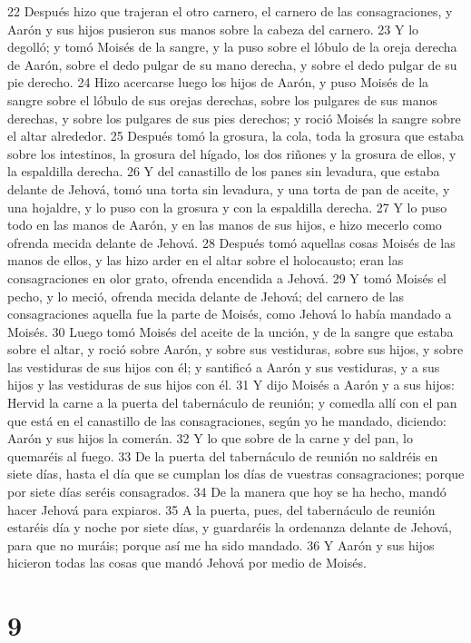 22 Después hizo que trajeran el otro carnero, el carnero de las consagraciones, y Aarón y sus hijos pusieron sus manos sobre la cabeza del carnero.
23 Y lo degolló; y tomó Moisés de la sangre, y la puso sobre el lóbulo de la oreja derecha de Aarón, sobre el dedo pulgar de su mano derecha, y sobre el dedo pulgar de su pie derecho.
24 Hizo acercarse luego los hijos de Aarón, y puso Moisés de la sangre sobre el lóbulo de sus orejas derechas, sobre los pulgares de sus manos derechas, y sobre los pulgares de sus pies derechos; y roció Moisés la sangre sobre el altar alrededor.
25 Después tomó la grosura, la cola, toda la grosura que estaba sobre los intestinos, la grosura del hígado, los dos riñones y la grosura de ellos, y la espaldilla derecha.
26 Y del canastillo de los panes sin levadura, que estaba delante de Jehová, tomó una torta sin levadura, y una torta de pan de aceite, y una hojaldre, y lo puso con la grosura y con la espaldilla derecha.
27 Y lo puso todo en las manos de Aarón, y en las manos de sus hijos, e hizo mecerlo como ofrenda mecida delante de Jehová.
28 Después tomó aquellas cosas Moisés de las manos de ellos, y las hizo arder en el altar sobre el holocausto; eran las consagraciones en olor grato, ofrenda encendida a Jehová.
29 Y tomó Moisés el pecho, y lo meció, ofrenda mecida delante de Jehová; del carnero de las consagraciones aquella fue la parte de Moisés, como Jehová lo había mandado a Moisés.
30 Luego tomó Moisés del aceite de la unción, y de la sangre que estaba sobre el altar, y roció sobre Aarón, y sobre sus vestiduras, sobre sus hijos, y sobre las vestiduras de sus hijos con él; y santificó a Aarón y sus vestiduras, y a sus hijos y las vestiduras de sus hijos con él.
31 Y dijo Moisés a Aarón y a sus hijos: Hervid la carne a la puerta del tabernáculo de reunión; y comedla allí con el pan que está en el canastillo de las consagraciones, según yo he mandado, diciendo: Aarón y sus hijos la comerán.
32 Y lo que sobre de la carne y del pan, lo quemaréis al fuego.
33 De la puerta del tabernáculo de reunión no saldréis en siete días, hasta el día que se cumplan los días de vuestras consagraciones; porque por siete días seréis consagrados.
34 De la manera que hoy se ha hecho, mandó hacer Jehová para expiaros.
35 A la puerta, pues, del tabernáculo de reunión estaréis día y noche por siete días, y guardaréis la ordenanza delante de Jehová, para que no muráis; porque así me ha sido mandado.
36 Y Aarón y sus hijos hicieron todas las cosas que mandó Jehová por medio de Moisés.

\chapter{9}

